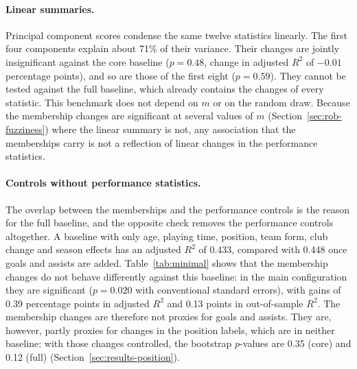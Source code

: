 \paragraph{Linear summaries.} Principal component scores condense the same twelve statistics linearly. The first four components explain about 71\% of their variance. Their changes are jointly insignificant against the core baseline ($p=0.48$, change in adjusted $R^2$ of $-0.01$ percentage points), and so are those of the first eight ($p=0.59$). They cannot be tested against the full baseline, which already contains the changes of every statistic. This benchmark does not depend on $m$ or on the random draw. Because the membership changes are significant at several values of $m$ (Section~\ref{sec:rob-fuzziness}) where the linear summary is not, any association that the memberships carry is not a reflection of linear changes in the performance statistics.

\paragraph{Controls without performance statistics.} The overlap between the memberships and the performance controls is the reason for the full baseline, and the opposite check removes the performance controls altogether. A baseline with only age, playing time, position, team form, club change and season effects has an adjusted $R^2$ of 0.433, compared with 0.448 once goals and assists are added. Table~\ref{tab:minimal} shows that the membership changes do not behave differently against this baseline: in the main configuration they are significant ($p=0.020$ with conventional standard errors), with gains of 0.39 percentage points in adjusted $R^2$ and 0.13 points in out-of-sample $R^2$. The membership changes are therefore not proxies for goals and assists. They are, however, partly proxies for changes in the position labels, which are in neither baseline: with those changes controlled, the bootstrap $p$-values are 0.35 (core) and 0.12 (full) (Section~\ref{sec:results-position}).

